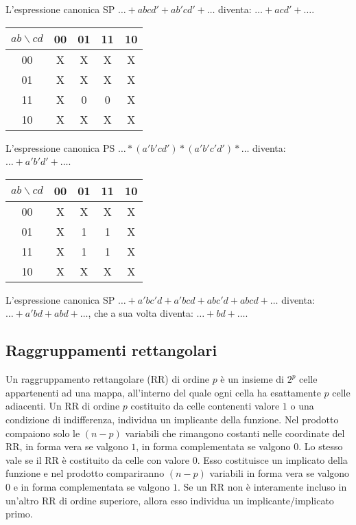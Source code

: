 \documentclass{subfiles}
\begin{document}
\noindent
L'espressione canonica SP $\dots + abcd' + ab'cd' + \dots$ diventa: $\dots + acd' + \dots$.

\begin{center}
\begin{tabular}{ |c|c|c|c|c| }
\hline
$ab \backslash cd$ & 00 & 01 & 11 & 10 \\
\hline
\hline
00 & X & X & X & X \\
01 & X & X & X & X \\
11 & X & 0 & 0 & X \\
10 & X & X & X & X \\
\hline
\end{tabular}
\end{center}

\noindent
L'espressione canonica PS $\dots * (a'b'cd') * (a'b'c'd') * \dots$ diventa: $\dots + a'b'd' + \dots$.

\begin{center}
\begin{tabular}{ |c|c|c|c|c| }
\hline
$ab \backslash cd$ & 00 & 01 & 11 & 10 \\
\hline
\hline
00 & X & X & X & X \\
01 & X & 1 & 1 & X \\
11 & X & 1 & 1 & X \\
10 & X & X & X & X \\
\hline
\end{tabular}
\end{center}

\noindent
L'espressione canonica SP $\dots + a'bc'd + a'bcd + abc'd + abcd + \dots$ diventa: $\dots + a'bd + abd + \dots$,
che a sua volta diventa: $\dots + bd + \dots$.

\subsection{Raggruppamenti rettangolari}

Un raggruppamento rettangolare (RR) di ordine $p$ è un insieme di $2^p$ celle appartenenti ad una mappa, all'interno del quale ogni cella ha esattamente $p$ celle adiacenti.
Un RR di ordine $p$ costituito da celle contenenti valore $1$ o una condizione di indifferenza, individua un implicante della funzione.
Nel prodotto compaiono solo le $(n-p)$ variabili che rimangono costanti nelle coordinate del RR, in forma vera se valgono $1$, in forma complementata se valgono $0$.
Lo stesso vale se il RR è costituito da celle con valore $0$. Esso costituisce un implicato della funzione e nel prodotto compariranno $(n-p)$ variabili in forma vera se valgono $0$ e in forma complementata se valgono $1$.
Se un RR non è interamente incluso in un'altro RR di ordine superiore, allora esso individua un implicante/implicato primo.\\
\end{document}
